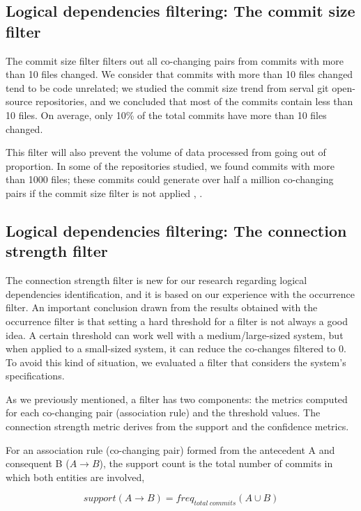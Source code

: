 \documentclass[runningheads]{comsis2}
\begin{document}
\subsection{Logical dependencies filtering: The commit size filter}
\label{commit_filter}

The commit size filter filters out all co-changing pairs from commits with more than 10 files changed. We consider that commits with more than 10 files changed tend to be code unrelated; we studied the commit size trend from serval git open-source repositories, and we concluded that most of the commits contain less than 10 files. On average, only 10\% of the total commits have more than 10 files changed. 

This filter will also prevent the volume of data processed from going out of proportion. In some of the repositories studied, we found commits with more than 1000 files; these commits could generate over half a million co-changing pairs if the commit size filter is not applied \cite{enase19}, \cite{saci19}. 



\subsection{Logical dependencies filtering: The connection strength filter}
\label{strength_filter}


The connection strength filter is new for our research regarding logical dependencies identification, and it is based on our experience with the occurrence filter.
An important conclusion drawn from the results obtained with the occurrence filter is that setting a hard threshold for a filter is not always a good idea. A certain threshold can work well with a medium/large-sized system, but when applied to a small-sized system, it can reduce the co-changes filtered to 0. To avoid this kind of situation, we evaluated a filter that considers the system's specifications. 


As we previously mentioned, a filter has two components: the metrics computed for each co-changing pair (association rule) and the threshold values. The connection strength metric derives from the support and the confidence metrics.

For an association rule (co-changing pair) formed from the antecedent A and consequent B ($A \rightarrow B$), 
the support count is the total number of commits in which both entities are involved,


\begin{equation}
support (A \rightarrow B) = freq_{total\ commits} {(A \cup B)}
\end{equation}
\end{document}
